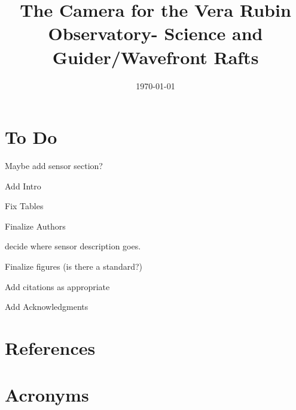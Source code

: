\documentclass[modern]{aastex62}
\begin{document}

\date{\today}
\title{The Camera for the Vera Rubin Observatory- Science and Guider/Wavefront Rafts}



\clearpage

\section{To Do}

Maybe add sensor section?

Add Intro

Fix Tables

Finalize Authors

decide where sensor description goes. 

Finalize figures (is there a standard?)

Add citations as appropriate

Add Acknowledgments
 
\clearpage
 


\appendix

\section{References} \label{sec:bib}



\section{Acronyms} \label{sec:acronyms}

\end{document}
